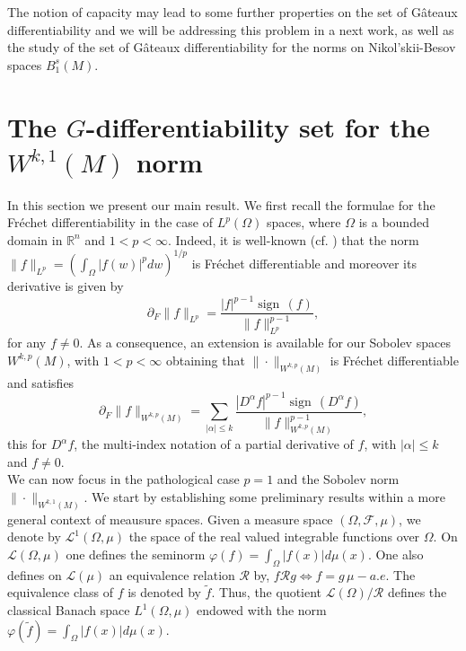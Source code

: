 \documentclass[a4paper,12pt,reqno]{amsart}%
\newcommand{\cal}{\mathcal}
\theoremstyle{definition}
\numberwithin{equation}{section}
\numberwithin{theorem}{section}
\newcommand{\beq}{\begin{equation}}
\newcommand{\eq}{\end{equation}}
\DeclareMathOperator*{\sign}{sign\,}
\begin{document}

 The notion of capacity may lead to some further properties on the set of G\^ateaux differentiability and we will be addressing this problem in a next work, as well as the study of the set of G\^ateaux differentiability for the norms on Nikol'skii-Besov spaces $B^s_1(M)$. 
\section[The $G$-differentiability set for the $W^{k,1}(M)$ norm]{The $G$-differentiability set for the $W^{k,1}(M)$ norm}
In this section we present our main result. We first recall the formulae for the Fr\'echet differentiability in the case of $L^{p}(\Omega)$ spaces, where $\Omega$ is a bounded domain in $\mathbb{R}^n$ and $1<p<\infty$. Indeed, it is well-known 
 (cf. \cite{di}) that the norm $\|f\|_{L^{p}} = (\int_{\Omega}|f(w)|^{p}dw)^{1/p}$ is Fr\'echet differentiable and moreover its derivative is given by 
\beq\partial_{F}\|f\|_{L^{p}}=\frac{|f|^{p-1}\sign(f)}{\|f\|_{L^{p}}^{p-1}},\label{formF1q}\eq
for any $f\neq 0$. As a consequence, an extension is available for our Sobolev spaces  $W^{k,p}(M)$, with $1<p<\infty$ obtaining that $\|\cdot\|_{W^{k,p}(M)}$ is Fréchet differentiable and sa\-tis\-fies
\[\partial_{F}\|f\|_{W^{k,p}(M)}=\sum_{|\alpha|\leq k}\frac{|D^{\alpha}f|^{p-1}\sign(D^{\alpha}f)}{\|f\|_{W^{k,p}(M)}^{p-1}},\] this for $D^{\alpha}f$, the multi-index notation of a partial derivative of $f$, with $|\alpha|\leq k$ and $f\neq 0$.\\

We can now focus in the pathological case $p=1$ and the Sobolev norm  $\|\cdot\|_{W^{k,1}(M)}$. We start by establishing some preliminary results within a more general context of meausure spaces. Given a measure space $(\Omega, \cal{F}, \mu)$, we denote by $\mathcal{L}^1(\Omega, \mu)$ the space of the real valued integrable functions over $\Omega$.  On $\mathcal{L}(\Omega, \mu)$ one defines the seminorm $\varphi(f)=\int_{\Omega}|f(x)|d\mu(x)$. One also defines on $\mathcal{L}(\mu)$  an equivalence relation $\mathcal{R}$  by, $f\mathcal{R}g\Longleftrightarrow f = g\, \mu-a.e.$ The equivalence class of $f$ is denoted by $\tilde{f}.$ Thus, the quotient $\mathcal{L}(\Omega)/ \mathcal{R}$ defines the classical Banach space $L^{1}(\Omega,\mu)$ endowed with the norm $\varphi(\tilde{f})=\int_{\Omega}|f(x)|d\mu(x)$.\\
\end{document}
